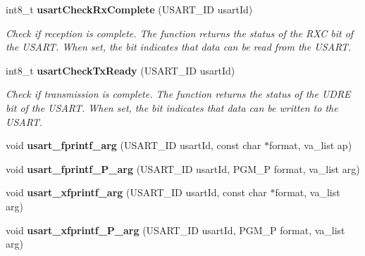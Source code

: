\begin{DoxyCompactItemize}
\item 
int8\+\_\+t {\bf usart\+Check\+Rx\+Complete} (U\+S\+A\+R\+T\+\_\+\+I\+D usart\+Id)
\begin{DoxyCompactList}\small\item\em Check if reception is complete. The function returns the status of the R\+X\+C bit of the U\+S\+A\+R\+T. When set, the bit indicates that data can be read from the U\+S\+A\+R\+T. \end{DoxyCompactList}\item 
int8\+\_\+t {\bf usart\+Check\+Tx\+Ready} (U\+S\+A\+R\+T\+\_\+\+I\+D usart\+Id)
\begin{DoxyCompactList}\small\item\em Check if transmission is complete. The function returns the status of the U\+D\+R\+E bit of the U\+S\+A\+R\+T. When set, the bit indicates that data can be written to the U\+S\+A\+R\+T. \end{DoxyCompactList}\item 
void {\bfseries usart\+\_\+fprintf\+\_\+arg} (U\+S\+A\+R\+T\+\_\+\+I\+D usart\+Id, const char $\ast$format, va\+\_\+list ap)\label{group__usart_async_module_gad3cf1cbb614711dcb8b73f7b7066cc24}

\item 
void {\bfseries usart\+\_\+fprintf\+\_\+\+P\+\_\+arg} (U\+S\+A\+R\+T\+\_\+\+I\+D usart\+Id, P\+G\+M\+\_\+\+P format, va\+\_\+list arg)\label{group__usart_async_module_ga8b9e6d432ec75ce20fd8225d02cd8340}

\item 
void {\bfseries usart\+\_\+xfprintf\+\_\+arg} (U\+S\+A\+R\+T\+\_\+\+I\+D usart\+Id, const char $\ast$format, va\+\_\+list arg)\label{group__usart_async_module_ga7f6efaab6a3c0a43d34bcce2f45a9062}

\item 
void {\bfseries usart\+\_\+xfprintf\+\_\+\+P\+\_\+arg} (U\+S\+A\+R\+T\+\_\+\+I\+D usart\+Id, P\+G\+M\+\_\+\+P format, va\+\_\+list arg)\label{group__usart_async_module_ga33e17cf0120f57e061a736a8eeb93fce}


\end{DoxyCompactItemize}
